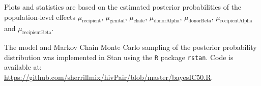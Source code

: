 \documentclass[12pt]{article}
\begin{document}
Plots and statistics are based on the estimated posterior probabilities of the population-level effects $\mu_{\text{recipient}}$, $\mu_{\text{genital}}$, $\mu_{\text{clade}}$, $\mu_{\text{donorAlpha}}$, $\mu_{\text{donorBeta}}$, $\mu_{\text{recipientAlpha}}$ and $\mu_{\text{recipientBeta}}$.

The model and Markov Chain Monte Carlo sampling of the posterior probability distribution was implemented in Stan using the \texttt{R} package \texttt{rstan}. Code is available at:\\
\url{https://github.com/sherrillmix/hivPair/blob/master/bayesIC50.R}.
\end{document}
